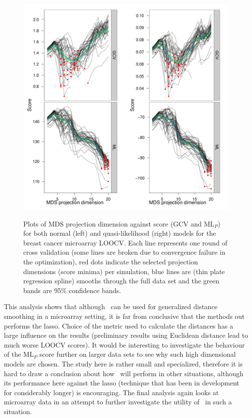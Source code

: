 \begin{figure}
\centering
\includegraphics[width=\textwidth]{gds/figs/breastcancer-dimselect.pdf} \\
\caption{Plots of MDS projection dimension against score (GCV and $\text{ML}_P$) for both normal (left) and quasi-likelihood (right) models for the breast cancer microarray LOOCV. Each line represents one round of cross validation (some lines are broken due to convergence failure in the optimization), red dots indicate the selected projection dimensions (score minima) per simulation, blue lines are (thin plate regression spline) smooths through the full data set and the green bands are 95\% confidence bands.}
\label{breastcancer-dimselect}
\end{figure}

This analysis shows that although \mdsds\ can be used for generalized distance smoothing in a microarray setting, it is far from conclusive that the methods out performs the lasso. Choice of the metric used to calculate the distances has a large influence on the results (preliminary results using Euclidean distance lead to much worse LOOCV scores). It would be interesting to investigate the behaviour of the $\text{ML}_P$ score further on larger data sets to see why such high dimensional models are chosen. The study here is rather small and specialized, therefore it is hard to draw a conclusion about how \mdsds\ will perform in other situations, although its performance here against the lasso (technique that has been in development for considerably longer) is encouraging. The final analysis again looks at microarray data in an attempt to further investigate the utility of \mdsds\ in such a situation.

